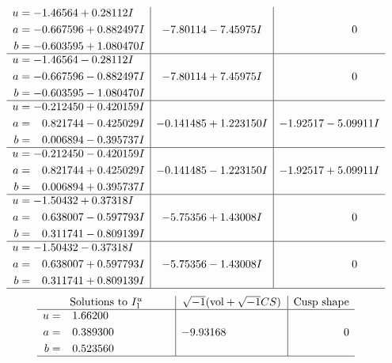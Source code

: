 \documentclass[1p]{elsarticle_modified}
\theoremstyle{definition}
\newcommand{\I}{\sqrt{-1}}
\begin{document}
$$\begin{array}{c|c|c}
\begin{aligned}
u &= -1.46564 + 0.28112 I \\
a &= -0.667596 + 0.882497 I \\
b &= -0.603595 + 1.080470 I\end{aligned}
 & -7.80114 - 7.45975 I & \phantom{-0.000000 } 0 \\ \hline\begin{aligned}
u &= -1.46564 - 0.28112 I \\
a &= -0.667596 - 0.882497 I \\
b &= -0.603595 - 1.080470 I\end{aligned}
 & -7.80114 + 7.45975 I & \phantom{-0.000000 } 0 \\ \hline\begin{aligned}
u &= -0.212450 + 0.420159 I \\
a &= \phantom{-}0.821744 - 0.425029 I \\
b &= \phantom{-}0.006894 - 0.395737 I\end{aligned}
 & -0.141485 + 1.223150 I & -1.92517 - 5.09911 I \\ \hline\begin{aligned}
u &= -0.212450 - 0.420159 I \\
a &= \phantom{-}0.821744 + 0.425029 I \\
b &= \phantom{-}0.006894 + 0.395737 I\end{aligned}
 & -0.141485 - 1.223150 I & -1.92517 + 5.09911 I \\ \hline\begin{aligned}
u &= -1.50432 + 0.37318 I \\
a &= \phantom{-}0.638007 - 0.597793 I \\
b &= \phantom{-}0.311741 - 0.809139 I\end{aligned}
 & -5.75356 + 1.43008 I & \phantom{-0.000000 } 0 \\ \hline\begin{aligned}
u &= -1.50432 - 0.37318 I \\
a &= \phantom{-}0.638007 + 0.597793 I \\
b &= \phantom{-}0.311741 + 0.809139 I\end{aligned}
 & -5.75356 - 1.43008 I & \phantom{-0.000000 } 0\\
 \hline 
 \end{array}$$\newpage$$\begin{array}{c|c|c}  
\text{Solutions to }I^u_{1}& \I (\text{vol} + \sqrt{-1}CS) & \text{Cusp shape}\\
 \hline 
\begin{aligned}
u &= \phantom{-}1.66200\phantom{ +0.000000I} \\
a &= \phantom{-}0.389300\phantom{ +0.000000I} \\
b &= \phantom{-}0.523560\phantom{ +0.000000I}\end{aligned}
 & -9.93168\phantom{ +0.000000I} & \phantom{-0.000000 } 0\\
 \hline 
 \end{array}$$\newpage\newpage\renewcommand{\arraystretch}{1}
\end{document}
